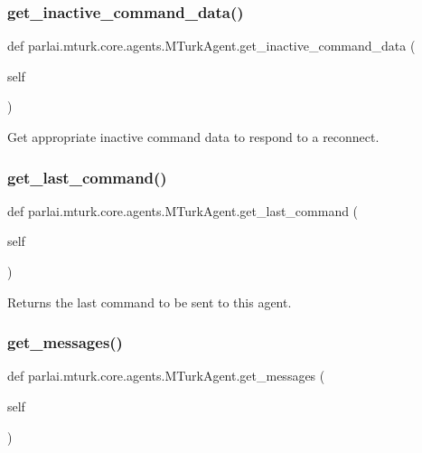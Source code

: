 \subsubsection{\texorpdfstring{get\+\_\+inactive\+\_\+command\+\_\+data()}{get\_inactive\_command\_data()}}
{\footnotesize\ttfamily def parlai.\+mturk.\+core.\+agents.\+M\+Turk\+Agent.\+get\+\_\+inactive\+\_\+command\+\_\+data (\begin{DoxyParamCaption}\item[{}]{self }\end{DoxyParamCaption})}

\begin{DoxyVerb}Get appropriate inactive command data to respond to a reconnect.
\end{DoxyVerb}
 \mbox{\label{classparlai_1_1mturk_1_1core_1_1agents_1_1MTurkAgent_a7d8989acb53debf63fc11246510f83b7}} 
\subsubsection{\texorpdfstring{get\+\_\+last\+\_\+command()}{get\_last\_command()}}
{\footnotesize\ttfamily def parlai.\+mturk.\+core.\+agents.\+M\+Turk\+Agent.\+get\+\_\+last\+\_\+command (\begin{DoxyParamCaption}\item[{}]{self }\end{DoxyParamCaption})}

\begin{DoxyVerb}Returns the last command to be sent to this agent.
\end{DoxyVerb}
 \mbox{\label{classparlai_1_1mturk_1_1core_1_1agents_1_1MTurkAgent_ae941b277cbfee3e76b543b780ca804f9}} 
\subsubsection{\texorpdfstring{get\+\_\+messages()}{get\_messages()}}
{\footnotesize\ttfamily def parlai.\+mturk.\+core.\+agents.\+M\+Turk\+Agent.\+get\+\_\+messages (\begin{DoxyParamCaption}\item[{}]{self }\end{DoxyParamCaption})}

